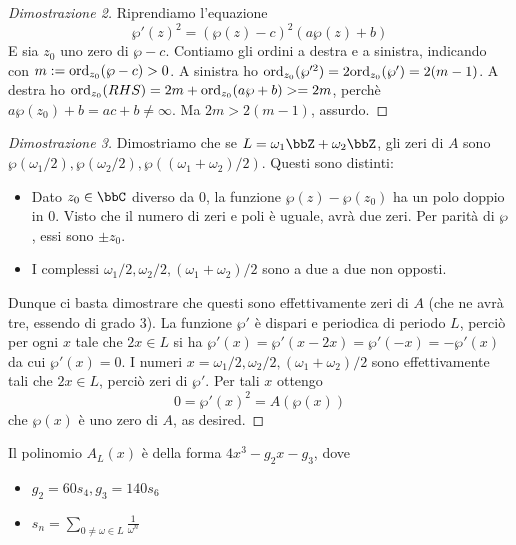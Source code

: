 \begin{proof}[Dimostrazione 2]
Riprendiamo l'equazione
$$\wp'(z)^2 = (\wp(z) - c)^2(a\wp(z)+b) $$
E sia $z_0$ uno zero di $\wp-c$. Contiamo gli ordini a destra e a sinistra, indicando con $m:=\text{ord}_{z_0}(\wp-c) > 0$.
A sinistra ho $\text{ord}_{z_0}( \wp'^2) = 2\text{ord}_{z_0}( \wp') = 2(m-1)$. A destra ho $\text{ord}_{z_0}(RHS) = 2m + \text{ord}_{z_0}(a\wp+b) >= 2m$, perchè $a \wp(z_0)+b = ac+b \neq \infty$. Ma $2m> 2(m-1)$, assurdo.
\end{proof}

\begin{proof}[Dimostrazione 3]
Dimostriamo che se $L=\omega_1\bbZ + \omega_2 \bbZ$, gli zeri di $A$ sono $ \wp(\omega_1/2), \wp(\omega_2/2), \wp((\omega_1+\omega_2)/2)$. Questi sono distinti:
\begin{itemize}
\item Dato $z_0 \in \bbC$ diverso da 0, la funzione $\wp(z) - \wp(z_0)$ ha un polo doppio in 0. Visto che il numero di zeri e poli è uguale, avrà due zeri. Per parità di $\wp$, essi sono $\pm z_0$.
\item I complessi $\omega_1/2, \omega_2/2, (\omega_1+\omega_2)/2$ sono a due a due non opposti.
\end{itemize}
Dunque ci basta dimostrare che questi sono effettivamente zeri di $A$ (che ne avrà tre, essendo di grado 3). La funzione $\wp'$ è dispari e periodica di periodo $L$, perciò per ogni $x$ tale che $2x \in L$ si ha
$\wp'(x) = \wp'(x-2x) = \wp'(-x) = -\wp'(x)$
da cui $\wp'(x) = 0$. I numeri $x=\omega_1/2, \omega_2/2, (\omega_1+\omega_2)/2$ sono effettivamente tali che $2x \in L$, perciò zeri di $\wp'$. Per tali $x$ ottengo
$$ 0 = \wp'(x)^2 = A(\wp(x))$$
che $\wp(x)$ è uno zero di $A$, as desired.
\end{proof}

\begin{proposizione}
Il polinomio $A_L(x)$ è della forma $4x^3-g_2x-g_3$, dove
\begin{itemize}
\item $g_2=60s_4, g_3=140s_6$
\item $\displaystyle s_n = \sum_{0 \neq \omega \in L} \frac{1}{\omega^n} $
\end{itemize}

\end{proposizione}

